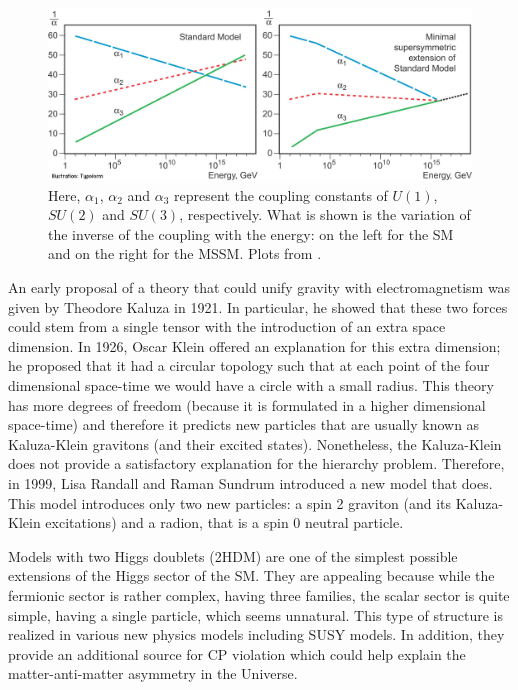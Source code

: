 \begin{figure}
	\includegraphics[width=\textwidth]{Figures/SM_MSSM.jpg}
	\caption{Here, $\alpha_1$, $\alpha_2$ and $\alpha_3$ represent the coupling constants of $U(1)$, $SU(2)$ and $SU(3)$, respectively. What is shown is the variation of the inverse of the coupling with the energy: on the left for the SM and on the right for the MSSM. Plots from \cite{running_coupling}.}
	\label{fig:SM_MSSM}
\end{figure}

An early proposal of a theory that could unify gravity with electromagnetism was given by Theodore Kaluza in 1921. In particular, he showed that these two forces could stem from a single tensor with the introduction of an extra space dimension. In 1926, Oscar Klein offered an explanation for this extra dimension; he proposed that it had a circular topology such that at each point of the four dimensional space-time we would have a circle with a small radius. This theory has more degrees of freedom (because it is formulated in a higher dimensional space-time) and therefore it predicts new particles that are usually known as Kaluza-Klein gravitons (and their excited states). Nonetheless, the Kaluza-Klein does not provide a satisfactory explanation for the hierarchy problem. Therefore, in 1999, Lisa Randall and Raman Sundrum introduced a new model that does. This model introduces only two new particles: a spin 2 graviton (and its Kaluza-Klein excitations) and a radion, that is a spin 0 neutral particle.

Models with two Higgs doublets (2HDM) are one of the simplest possible extensions of the Higgs sector of the SM. They are appealing because while the fermionic sector is rather complex, having three families, the scalar sector is quite simple, having a single particle, which seems unnatural. This type of structure is realized in various new physics models including SUSY models. In addition, they provide an additional source for CP violation which could help explain the matter-anti-matter asymmetry in the Universe. 

